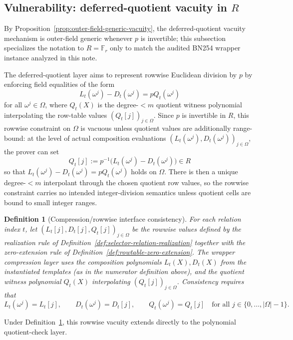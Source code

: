 ﻿\documentclass[11pt]{article}
\newtheorem{definition}[theorem]{Definition}
\newcommand{\F}{\mathbb{F}}
\begin{document}
\subsection{Vulnerability: deferred-quotient vacuity in \(R\)}

By Proposition~\ref{prop:outer-field-generic-vacuity}, the deferred-quotient
vacuity mechanism is outer-field generic whenever \(p\) is invertible; this
subsection specializes the notation to \(R=\F_r\) only to match the audited
BN254 wrapper instance analyzed in this note.

The deferred-quotient layer aims to represent rowwise Euclidean division by
\(p\) by enforcing field equalities of the form
\[
L_t(\omega^j)-D_t(\omega^j)=pQ_t(\omega^j)
\]
for all \(\omega^j\in\Omega\), where \(Q_t(X)\) is the degree-\(<m\) quotient
witness polynomial interpolating the row-table values
\((Q_t[j])_{j\in\Omega}\).
Since \(p\) is invertible in \(R\), this rowwise constraint on \(\Omega\) is
vacuous unless quotient values are additionally range-bound: at the level of
actual composition evaluations \((L_t(\omega^j),D_t(\omega^j))_{j\in\Omega}\),
the prover can set
\[
Q_t[j]:=p^{-1}\bigl(L_t(\omega^j)-D_t(\omega^j)\bigr)\in R
\]
so that \(L_t(\omega^j)-D_t(\omega^j)=pQ_t(\omega^j)\) holds on \(\Omega\).
There is then a unique degree-\(<m\) interpolant through the chosen quotient
row values, so the rowwise constraint carries no intended integer-division
semantics unless quotient cells are bound to small integer ranges.

\begin{definition}[Compression/rowwise interface consistency]
\label{def:compression-rowwise-rhs-consistency}
For each relation index \(t\), let \((L_t[j],D_t[j],Q_t[j])_{j\in\Omega}\) be the
rowwise values defined by the realization rule of
Definition~\ref{def:selector-relation-realization} together with the
zero-extension rule of Definition~\ref{def:rowtable-zero-extension}.
The wrapper compression layer uses the composition polynomials \(L_t(X),D_t(X)\)
from the instantiated templates (as in the numerator definition above), and the
quotient witness polynomial \(Q_t(X)\) interpolating \((Q_t[j])_{j\in\Omega}\).
Consistency requires that
\[
L_t(\omega^j)=L_t[j],
\qquad
D_t(\omega^j)=D_t[j],
\qquad
Q_t(\omega^j)=Q_t[j]
\quad\text{for all }j\in\{0,\dots,|\Omega|-1\}.
\]
\end{definition}

Under Definition~\ref{def:compression-rowwise-rhs-consistency}, this rowwise
vacuity extends directly to the polynomial quotient-check layer.
\end{document}
